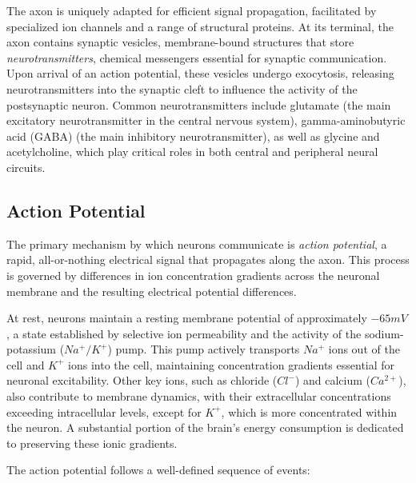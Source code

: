 The axon is uniquely adapted for efficient signal propagation, facilitated by specialized
ion channels and a range of structural proteins. At its terminal, the axon contains
synaptic vesicles, membrane-bound structures that store \emph{neurotransmitters}, chemical messengers
essential for synaptic communication. Upon arrival of an action potential, these vesicles
undergo exocytosis, releasing neurotransmitters into the synaptic cleft to influence the
activity of the postsynaptic neuron. Common neurotransmitters include glutamate (the main excitatory neurotransmitter in the central nervous system), 
gamma-aminobutyric acid (GABA) (the main inhibitory neurotransmitter),
as well as glycine and acetylcholine, which play critical roles in both central and
peripheral neural circuits.

\subsection{Action Potential}
\label{subsec:action_potential}
The primary mechanism by which neurons communicate is \emph{action potential}, a rapid, 
all-or-nothing electrical signal that propagates along the axon. This process is governed
by differences in ion concentration gradients across the neuronal membrane and the resulting
electrical potential differences.

At rest, neurons maintain a resting membrane potential of approximately $-65 mV$, a
state established by selective ion permeability and the activity of the sodium-potassium 
($Na^{+}/K^{+}$) pump. This pump actively transports $Na^{+}$ ions out of the cell and $K^{+}$ 
ions into the cell, maintaining concentration gradients essential for neuronal excitability. Other
key ions, such as chloride ($Cl^{-}$) and calcium ($Ca^{2+}$), also contribute to membrane dynamics, 
with their extracellular concentrations exceeding intracellular levels, except for $K^{+}$, which
is more concentrated within the neuron. A substantial portion of the brain's energy
consumption is dedicated to preserving these ionic gradients.

The action potential follows a well-defined sequence of events:

